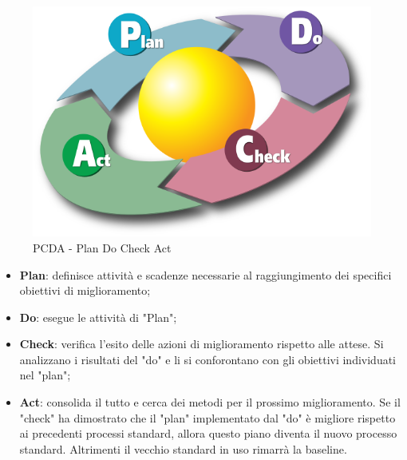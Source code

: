     \begin{figure}[h]
        \centering
        \includegraphics[scale=0.2]{sezioni/Immagini/PDCA.png}
        \caption{PCDA - Plan Do Check Act}
    \end{figure}

    \begin{itemize}
    \item \textbf{Plan}: definisce attività e scadenze necessarie al raggiungimento dei specifici obiettivi di miglioramento;
    \item \textbf{Do}: esegue le attività di "Plan";
    \item \textbf{Check}: verifica l'esito delle azioni di miglioramento rispetto alle attese. Si analizzano i risultati del "do" e li si conforontano con gli obiettivi individuati nel "plan";
    \item \textbf{Act}: consolida il tutto e cerca dei metodi per il prossimo miglioramento. Se il "check" ha dimostrato che il "plan" implementato dal "do" è migliore rispetto ai precedenti processi standard, allora questo piano diventa il nuovo processo standard. Altrimenti il vecchio standard in uso rimarrà la baseline.
    \end{itemize}